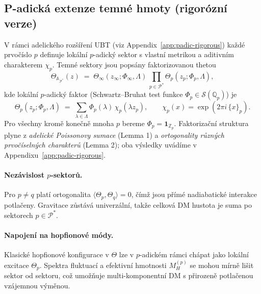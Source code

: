 \subsection{P-adická extenze temné hmoty (rigorózní verze)}
V rámci adelického rozšíření UBT (viz Appendix~\ref{app:padic-rigorous}) každé prvočíslo $p$ definuje lokální $p$-adický sektor
s vlastní metrikou a aditivním charakterem $\chi_p$. Temné sektory jsou popsány faktorizovanou thetou
\begin{equation}
\Theta_{\mathbb{A}_{\mathcal{P}^\ast}}(z) \;=\; \Theta_\infty(z_\infty;\Phi_\infty,\Lambda)\,\prod_{p\in\mathcal{P}^\ast}\Theta_p(z_p;\Phi_p,\Lambda),
\end{equation}
kde lokální $p$-adický faktor (Schwartz--Bruhat test funkce $\Phi_p\in\mathcal{S}(\mathbb{Q}_p)$) je
\begin{equation}
\Theta_p(z_p;\Phi_p,\Lambda) \;=\; \sum_{\lambda\in\Lambda} \Phi_p(\lambda)\,\chi_p(\lambda z_p),\qquad
\chi_p(x)=\exp(2\pi i\,\{x\}_p).
\end{equation}
Pro všechny kromě konečně mnoha $p$ bereme $\Phi_p=\mathbf{1}_{\mathbb{Z}_p}$. Faktorizační struktura plyne z \emph{adelické Poissonovy sumace} (Lemma 1)
a \emph{ortogonality různých prvočíselných charakterů} (Lemma 2); oba výsledky uvádíme v Appendixu~\ref{app:padic-rigorous}.

\paragraph{Nezávislost $p$-sektorů.}
Pro $p\neq q$ platí ortogonalita $\langle \Theta_p,\Theta_q\rangle=0$, čímž jsou přímé nadiabatic\-ké interakce potlačeny.
Gravitace zůstává univerzální, takže celková DM hustota je suma po sektorech $p\in\mathcal{P}^\ast$.

\paragraph{Napojení na hopfionové módy.}
Klasické hopfionové konfigurace v $\Theta$ lze v $p$-adickém rámci chápat jako lokální excitace $\Theta_p$.
Spektra fluktuací a efektivní hmotnosti $M_H^{(p)}$ se mohou mírně lišit sektor od sektoru, což umožňuje multi-komponentní DM s přirozeně potlačenou vzájemnou výměnou.

